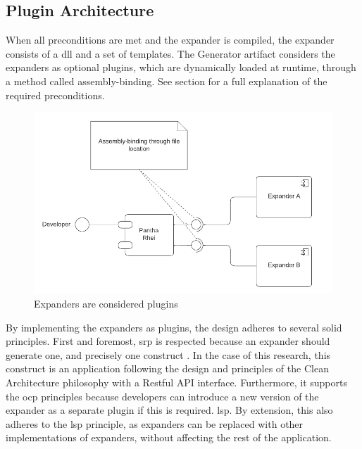 \subsection{Plugin Architecture} \label{subsec:plugin_architecture}

When all preconditions are met and the expander is compiled, the expander consists of a
\gls{dll} and a set of templates. The Generator artifact considers the expanders as
optional plugins, which are dynamically loaded at runtime, through a method called
assembly-binding. See section  for a full explanation of the
required preconditions.

\begin{figure}[H]
  \centering
  \includegraphics[width=1\textwidth]{Figures/plugin_architecture.pdf}
  \caption[Plugin Archticture]{Expanders are considered plugins}
  \label{fi:plugin_architecture}
\end{figure}

By implementing the expanders as plugins, the design adheres to several \gls{solid}
principles. First and foremost, \gls{srp} is respected because an expander should generate
one, and precisely one construct \parencite[403]{mannaert_normalized_2016}. In the case of
this research, this construct is an application following the design and principles of the
Clean Architecture philosophy with a Restful API interface. Furthermore, it supports the
\gls{ocp} principles because developers can introduce a new version of the expander as a
separate plugin if this is required. \gls{lsp}. By extension, this also adheres to the
\gls{lsp} principle, as expanders can be replaced with other implementations of expanders,
without affecting the rest of the application.